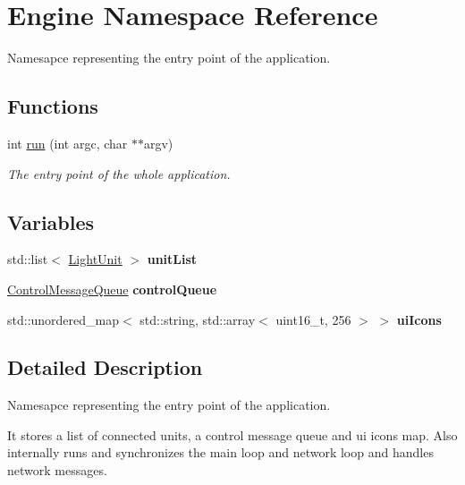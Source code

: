 \hypertarget{namespaceEngine}{}\section{Engine Namespace Reference}
\label{namespaceEngine}


Namesapce representing the entry point of the application.  


\subsection*{Functions}
\begin{DoxyCompactItemize}
\item 
int \mbox{\hyperlink{namespaceEngine_a18825e7d28c8436bb36f3ca02b99d41f}{run}} (int argc, char $\ast$$\ast$argv)
\begin{DoxyCompactList}\small\item\em The entry point of the whole application. \end{DoxyCompactList}\end{DoxyCompactItemize}
\subsection*{Variables}
\begin{DoxyCompactItemize}
\item 
\mbox{\label{namespaceEngine_ac3baaa2258cdfbc45de266c5b5641454}} 
std\+::list$<$ \mbox{\hyperlink{classLightUnit}{Light\+Unit}} $>$ {\bfseries unit\+List}
\item 
\mbox{\label{namespaceEngine_a300dfed93e6ea0213f64e184373517ed}} 
\mbox{\hyperlink{classControlMessageQueue}{Control\+Message\+Queue}} {\bfseries control\+Queue}
\item 
\mbox{\label{namespaceEngine_ae562ecbc72c843b594695a058487d3cb}} 
std\+::unordered\+\_\+map$<$ std\+::string, std\+::array$<$ uint16\+\_\+t, 256 $>$ $>$ {\bfseries ui\+Icons}
\end{DoxyCompactItemize}


\subsection{Detailed Description}
Namesapce representing the entry point of the application. 

It stores a list of connected units, a control message queue and ui icons map. Also internally runs and synchronizes the main loop and network loop and handles network messages. 

